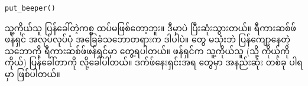 %
\setlength{\fboxsep}{0pt}
\begin{verbatim}
put_beeper()
\end{verbatim}
%
သူ့ကိုယ်သူ ပြန်ခေါ်တဲ့ကစ္စ ထပ်မဖြစ်တော့ဘူး။ ဒီမှာပဲ ပြီးဆုံးသွားတယ်။ ရီကားဆစ်ဖ် ဖန်ရှင် အလုပ်လုပ်ပုံ အခြေခံသဘောတရားက ဒါပါပဲ။  တွေ မသုံးဘဲ ပြန်ကျော့နေတဲ့ သဘောကို ရီကားဆစ်ဖ်ဖန်ရှင်မှာ တွေ့ရပါတယ်။ ဖန်ရှင်က သူ့ကိုယ်သူ (သို့ ကိုယ့်ကိုကိုယ်) ပြန်ခေါ်တာကို  လို့ခေါ်ပါတယ်။ ဒက်ဖ်နေးရှင်းအရ  တွေမှာ  အနည်းဆုံး တစ်ခု ပါရမှာ ဖြစ်ပါတယ်။



